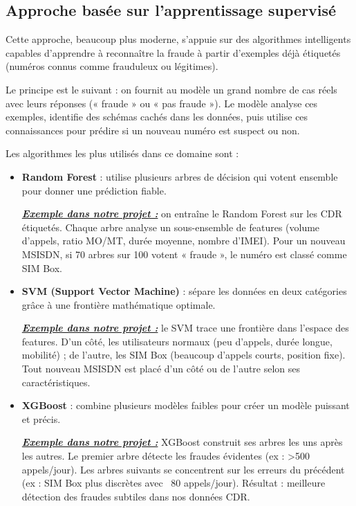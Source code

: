 \documentclass[12pt, oneside, a4paper]{report}
\begin{document}
\subsection{Approche basée sur l'apprentissage  supervisé}
Cette approche, beaucoup plus moderne, s'appuie sur des algorithmes intelligents capables d'apprendre à reconnaître la fraude à partir d'exemples déjà étiquetés (numéros connus comme frauduleux ou légitimes).

Le principe est le suivant : on fournit au modèle un grand nombre de cas réels avec leurs réponses (« fraude » ou « pas fraude »). Le modèle analyse ces exemples, identifie des schémas cachés dans les données, puis utilise ces connaissances pour prédire si un nouveau numéro est suspect ou non.

Les algorithmes les plus utilisés dans ce domaine sont :
\begin{itemize}
\item \textbf{Random Forest} : utilise plusieurs arbres de décision qui votent ensemble pour donner une prédiction fiable.

\underline{\textit{\textbf{Exemple dans notre projet :}}} on entraîne le Random Forest sur les CDR étiquetés. Chaque arbre analyse un sous-ensemble de features (volume d'appels, ratio MO/MT, durée moyenne, nombre d'IMEI). Pour un nouveau MSISDN, si 70 arbres sur 100 votent « fraude », le numéro est classé comme SIM Box.
\vspace{0.5cm}
 
\item \textbf{SVM (Support Vector Machine)} : sépare les données en deux catégories grâce à une frontière mathématique optimale.

\underline{\textit{\textbf{Exemple dans notre projet :}}} le SVM trace une frontière dans l'espace des features. D'un côté, les utilisateurs normaux (peu d'appels, durée longue, mobilité) ; de l'autre, les SIM Box (beaucoup d'appels courts, position fixe). Tout nouveau MSISDN est placé d'un côté ou de l'autre selon ses caractéristiques.

 \vspace{0.5cm}
\item \textbf{XGBoost} : combine plusieurs modèles faibles pour créer un modèle puissant et précis.

\underline{\textit{\textbf{Exemple dans notre projet :}}} XGBoost construit ses arbres les uns après les autres. Le premier arbre détecte les fraudes évidentes (ex : >500 appels/jour). Les arbres suivants se concentrent sur les erreurs du précédent (ex : SIM Box plus discrètes avec ~80 appels/jour). Résultat : meilleure détection des fraudes subtiles dans nos données CDR.
 \vspace{0.5cm}
 

\end{itemize}
\end{document}
